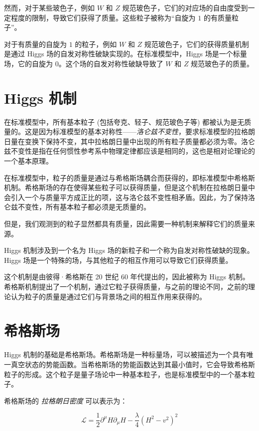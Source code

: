\documentclass[oneside,a4paper,openany,11pt]{ctexbook}
\begin{document}
然而，对于某些玻色子，例如 $W$ 和 $Z$ 规范玻色子，它们的对应场的自由度受到一定程度的限制，导致它们获得了质量。这些粒子被称为“自旋为 $1$ 的有质量粒子”。

对于有质量的自旋为 $1$ 的粒子，例如 $W$ 和 $Z$ 规范玻色子，它们的获得质量机制是通过 Higgs 场的自发对称性破缺实现的。在标准模型中，Higgs 场是一个标量场，它的自旋为 $0$。这个场的自发对称性破缺导致了 $W$ 和 $Z$ 规范玻色子的质量。

\section{Higgs 机制}

在标准模型中，所有基本粒子 (包括夸克、轻子、规范玻色子等) 都被认为是无质量的。这是因为标准模型的基本对称性——\emph{洛仑兹不变性}，要求标准模型的拉格朗日量在变换下保持不变，其中拉格朗日量中出现的所有粒子质量都必须为零。洛仑兹不变性是指在任何惯性参考系中物理定律都应该是相同的，这也是相对论理论的一个基本原理。

在标准模型中，粒子的质量是通过与希格斯场耦合而获得的，即标准模型中希格斯机制。希格斯场的存在使得某些粒子可以获得质量，但是这个机制在拉格朗日量中会引入一个与质量平方成正比的项，这与洛仑兹不变性相矛盾。因此，为了保持洛仑兹不变性，所有基本粒子都必须是无质量的。

但是，我们观测到的粒子显然都具有质量，因此需要一种机制来解释它们的质量来源。

Higgs 机制涉及到一个名为 Higgs 场的新粒子和一个称为自发对称性破缺的现象。Higgs 场是一个特殊的场，与其他粒子的相互作用可以导致它们获得质量。

这个机制是由彼得·希格斯在 20 世纪 60 年代提出的，因此被称为 Higgs 机制。希格斯机制提出了一个机制，通过它粒子获得质量，与之前的理论不同，之前的理论认为粒子的质量是通过它们与背景场之间的相互作用来获得的。

\section{希格斯场}

Higgs 机制的基础是希格斯场。希格斯场是一种标量场，可以被描述为一个具有唯一真空状态的势能函数。当希格斯场的势能函数达到其最小值时，它会导致希格斯粒子的形成。这个粒子是量子场论中一种基本粒子，也是标准模型中的一个基本粒子。

希格斯场的 \emph{拉格朗日密度} 可以表示为：

\begin{equation}
    \mathcal{L}=\frac{1}{2} \partial^\mu H \partial_\mu H - \frac{\lambda}{4} \left(H^2-v^2\right)^2
\end{equation}
\end{document}
